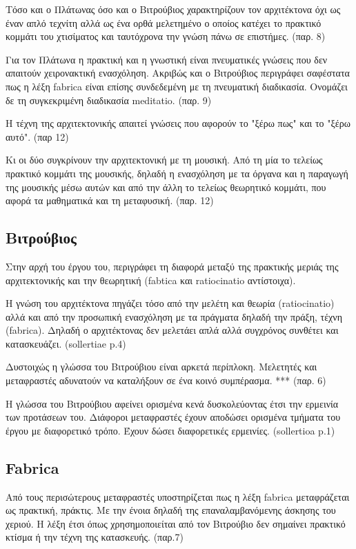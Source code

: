 Τόσο και ο Πλάτωνας όσο και ο Βιτρούβιος χαρακτηρίζουν τον αρχιτέκτονα όχι ως 
έναν απλό τεχνίτη αλλά ως ένα ορθά μελετημένο ο οποίος κατέχει το πρακτικό 
κομμάτι του χτισίματος και ταυτόχρονα την γνώση πάνω σε επιστήμες. (παρ. 8)

Για τον Πλάτωνα η πρακτική και η γνωστική είναι πνευματικές γνώσεις που δεν 
απαιτούν χειρονακτική ενασχόληση. Ακριβώς και ο Βιτρούβιος περιγράφει 
σαφέστατα πως η λέξη fabrica είναι επίσης συνδεδεμένη με τη πνευματική 
διαδικασία. Ονομάζει δε τη συγκεκριμένη διαδικασία meditatio. (παρ. 9)

Η τέχνη της αρχιτεκτονικής απαιτεί γνώσεις που αφορούν το "ξέρω πως" και το 
"ξέρω αυτό". (παρ 12)

Κι οι δύο συγκρίνουν την αρχιτεκτονική με τη μουσική. Από τη μία το τελείως 
πρακτικό κομμάτι της μουσικής, δηλαδή η ενασχόληση με τα όργανα και η παραγωγή 
της μουσικής μέσω αυτών και από την άλλη το τελείως θεωρητικό κομμάτι, που 
αφορά τα μαθηματικά και τη μεταφυσική. (παρ. 12)

\subsection{Βιτρούβιος}

Στην αρχή του έργου του, περιγράφει τη διαφορά μεταξύ της πρακτικής μεριάς της
αρχιτεκτονικής και την θεωρητική (fabtica και ratiocinatio αντίστοιχα).

Η γνώση του αρχιτέκτονα πηγάζει τόσο από την μελέτη και θεωρία (ratiocinatio)
αλλά και από την προσωπική ενασχόληση με τα πράγματα δηλαδή την πράξη, τέχνη
(fabrica). Δηλαδή ο αρχιτέκτονας δεν μελετάει απλά αλλά συγχρόνος συνθέτει και
κατασκευάζει. (sollertiae p.4)

Δυστοιχώς η γλώσσα του Βιτρούβιου είναι αρκετά περίπλοκη. Μελετητές και
μεταφραστές αδυνατούν να καταλήξουν σε ένα κοινό συμπέρασμα. *** (παρ. 6)

Η γλώσσα του Βιτρούβιου αφείνει ορισμένα κενά δυσκολεύοντας έτσι την ερμεινία
των προτάσεων του. Διάφοροι μεταφραστές έχουν αποδώσει ορισμένα τμήματα του
έργου με διαφορετικό τρόπο. Έχουν δώσει διαφορετικές ερμεινίες. (sollertioa p.1)

\subsection{Fabrica}

Από τους περισώτερους μεταφραστές υποστηρίζεται πως η λέξη fabrica μεταφράζεται
ως πρακτική, πράκτις. Με την ένοια δηλαδή της επαναλαμβανόμενης άσκησης του
χεριού. Η λέξη έτσι όπως χρησημοποιείται από τον Βιτρούβιο δεν σημαίνει πρακτικό
κτίσμα ή την τέχνη της κατασκευής. (παρ.7)

